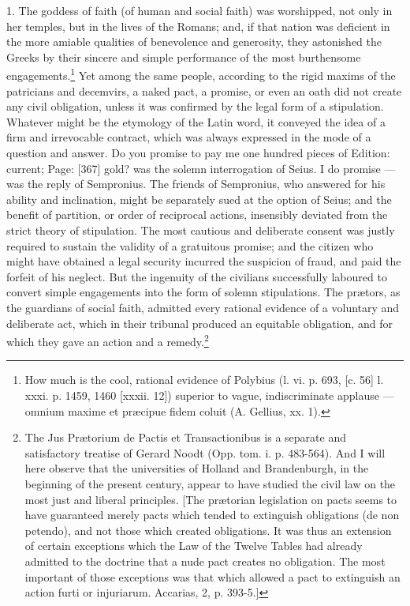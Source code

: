 1. The goddess of faith (of human and social faith) was worshipped, not only in her temples, but in the lives of the Romans; and, if that nation was deficient in the more amiable qualities of benevolence and generosity, they astonished the Greeks by their sincere and simple performance of the most burthensome engagements.\footnote{How much is the cool, rational evidence of Polybius (l. vi. p. 693, [c. 56] l. xxxi. p. 1459, 1460 [xxxii. 12]) superior to vague, indiscriminate applause \texthebrew{—} omnium maxime et præcipue fidem coluit (A. Gellius, xx. 1).} Yet among the same people, according to the rigid maxims of the patricians and decemvirs, a naked pact, a promise, or even an oath did not create any civil obligation, unless it was confirmed by the legal form of a stipulation. Whatever might be the etymology of the Latin word, it conveyed the idea of a firm and irrevocable contract, which was always expressed in the mode of a question and answer. Do you promise to pay me one hundred pieces of Edition: current; Page: [367] gold? was the solemn interrogation of Seius. I do promise \texthebrew{—} was the reply of Sempronius. The friends of Sempronius, who answered for his ability and inclination, might be separately sued at the option of Seius; and the benefit of partition, or order of reciprocal actions, insensibly deviated from the strict theory of stipulation. The most cautious and deliberate consent was justly required to sustain the validity of a gratuitous promise; and the citizen who might have obtained a legal security incurred the suspicion of fraud, and paid the forfeit of his neglect. But the ingenuity of the civilians successfully laboured to convert simple engagements into the form of solemn stipulations. The prætors, as the guardians of social faith, admitted every rational evidence of a voluntary and deliberate act, which in their tribunal produced an equitable obligation, and for which they gave an action and a remedy.\footnote{The Jus Prætorium de Pactis et Transactionibus is a separate and satisfactory treatise of Gerard Noodt (Opp. tom. i. p. 483-564). And I will here observe that the universities of Holland and Brandenburgh, in the beginning of the present century, appear to have studied the civil law on the most just and liberal principles. [The prætorian legislation on pacts seems to have guaranteed merely pacts which tended to extinguish obligations (de non petendo), and not those which created obligations. It was thus an extension of certain exceptions which the Law of the Twelve Tables had already admitted to the doctrine that a nude pact creates no obligation. The most important of those exceptions was that which allowed a pact to extinguish an action furti or injuriarum. Accarias, 2, p. 393-5.]}

